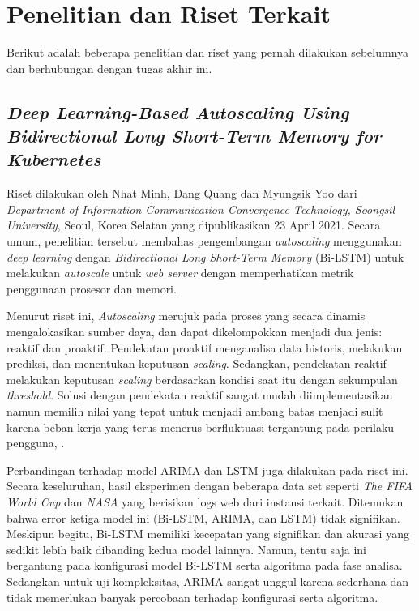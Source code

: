 \section{Penelitian dan Riset Terkait}
Berikut adalah beberapa penelitian dan riset yang pernah dilakukan sebelumnya dan berhubungan dengan tugas akhir ini.

\subsection{\textit{Deep Learning-Based Autoscaling Using Bidirectional Long Short-Term Memory for Kubernetes}}
Riset dilakukan oleh Nhat Minh, Dang Quang dan Myungsik Yoo dari \textit{Department of Information Communication Convergence Technology, Soongsil University}, Seoul, Korea Selatan yang dipublikasikan 23 April 2021. Secara umum, penelitian tersebut membahas pengembangan \textit{autoscaling} menggunakan \textit{deep learning} dengan \textit{Bidirectional Long Short-Term Memory} (Bi-LSTM) untuk melakukan \textit{autoscale} untuk \textit{web server} dengan memperhatikan metrik penggunaan prosesor dan memori.

Menurut riset ini, \textit{Autoscaling} merujuk pada proses yang secara dinamis mengalokasikan sumber daya, dan dapat dikelompokkan menjadi dua jenis: reaktif dan proaktif. Pendekatan proaktif menganalisa data historis, melakukan prediksi, dan menentukan keputusan \textit{scaling}. Sedangkan, pendekatan reaktif melakukan keputusan \textit{scaling} berdasarkan kondisi saat itu dengan sekumpulan \textit{threshold}. Solusi dengan pendekatan reaktif sangat mudah diimplementasikan namun memilih nilai yang tepat untuk menjadi ambang batas menjadi sulit karena beban kerja yang terus-menerus berfluktuasi tergantung pada perilaku pengguna, \parencite{riset1}.

Perbandingan terhadap model ARIMA dan LSTM juga dilakukan pada riset ini. Secara keseluruhan, hasil eksperimen dengan beberapa data set seperti \textit{The FIFA World Cup} dan \textit{NASA} yang berisikan logs web dari instansi terkait. Ditemukan bahwa error ketiga model ini (Bi-LSTM, ARIMA, dan LSTM) tidak signifikan. Meskipun begitu, Bi-LSTM memiliki kecepatan yang signifikan dan akurasi yang sedikit lebih baik dibanding kedua model lainnya. Namun, tentu saja ini bergantung pada konfigurasi model Bi-LSTM serta algoritma pada fase analisa. Sedangkan untuk uji kompleksitas, ARIMA sangat unggul karena sederhana dan tidak memerlukan banyak percobaan terhadap konfigurasi serta algoritma.

